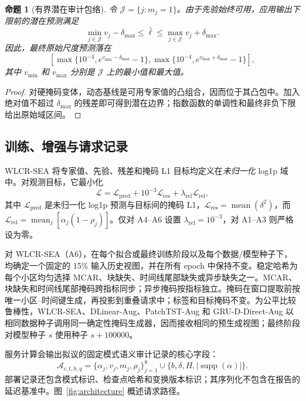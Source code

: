 \documentclass[10pt,conference,letterpaper]{IEEEtran}
\newtheorem{proposition}{命题}
\newcommand{\method}{WLCR-SEA}
\begin{document}
\begin{proposition}[有界潜在审计包络]
令 $\mathcal J=\{j:m_j=1\}$。由于先验始终可用，应用输出下限前的潜在预测满足
\begin{equation}
\min_{j\in\mathcal J}v_j-\delta_{\max}
\leq \widehat\ell \leq
\max_{j\in\mathcal J}v_j+\delta_{\max}.
\end{equation}
因此，最终原始尺度预测落在
\begin{equation}
\left[\max\{10^{-4},e^{v_{\min}-\delta_{\max}}-1\},
\max\{10^{-4},e^{v_{\max}+\delta_{\max}}-1\}\right],
\end{equation}
其中 $v_{\min}$ 和 $v_{\max}$ 分别是 $\mathcal J$ 上的最小值和最大值。
\end{proposition}
\begin{proof}
对硬掩码变体，动态基线是可用专家值的凸组合，因而位于其凸包中。加入绝对值不超过 $\delta_{\max}$ 的残差即可得到潜在边界；指数函数的单调性和最终非负下限给出原始域区间。
\end{proof}

\subsection{训练、增强与请求记录}
WLCR-SEA 将专家值、先验、残差和掩码 L1 目标均定义在\emph{未归一化} log1p 域中。对观测目标，它最小化
\begin{equation}
\mathcal L=\mathcal L_{\mathrm{pred}}
+10^{-3}\mathcal L_{\mathrm{res}}
+\lambda_{\mathrm{rel}}\mathcal L_{\mathrm{rel}},
\end{equation}
其中 $\mathcal L_{\mathrm{pred}}$ 是未归一化 log1p 预测与目标间的掩码 L1，$\mathcal L_{\mathrm{res}}=\operatorname{mean}(\delta^2)$，而 $\mathcal L_{\mathrm{rel}}=\operatorname{mean}_j[\alpha_j(1-\rho_j)]$。仅对 A4--A6 设置 $\lambda_{\mathrm{rel}}=10^{-3}$，对 A1--A3 则严格设为零。

对 \method{}（A6），在每个拟合或最终训练阶段以及每个数据/模型种子下，均确定一个固定的 15\% 输入历史视图，并在所有 epoch 中保持不变。稳定哈希为每个小区均匀选择 MCAR、块缺失、时间线尾部缺失或异步缺失之一。MCAR、块缺失和时间线尾部掩码跨指标同步；异步掩码按指标独立。掩码在窗口提取前按唯一小区--时间键生成，再投影到重叠请求中；标签和目标掩码不变。为公平比较鲁棒性，\method{}、DLinear-Aug、PatchTST-Aug 和 GRU-D-Direct-Aug 以相同数据种子调用同一确定性掩码生成器，因而接收相同的预生成视图；最终阶段对模型种子 $s$ 使用种子 $s+100000$。

服务计算会输出拟议的固定模式语义审计记录的核心字段：
\begin{equation}
\mathcal A_{c,t,h,q}=
\{\alpha_j,v_j,m_j,\rho_j\}_{j=1}^{8}
\cup\{b,\delta,H,|\operatorname{supp}(\alpha)|\}.
\end{equation}
部署记录还包含模式标识、检查点哈希和变换版本标识；其序列化不包含在报告的延迟基准中。图~\ref{fig:architecture} 概述请求路径。
\end{document}
